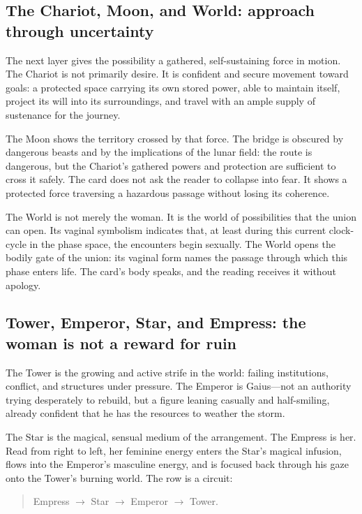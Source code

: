 \subsection{The Chariot, Moon, and World: approach through uncertainty}

The next layer gives the possibility a gathered, self-sustaining force in motion.
The Chariot is not primarily desire. It is confident and secure movement toward
goals: a protected space carrying its own stored power, able to maintain itself,
project its will into its surroundings, and travel with an ample supply of
sustenance for the journey.

The Moon shows the territory crossed by that force. The bridge is obscured by
dangerous beasts and by the implications of the lunar field: the route is
dangerous, but the Chariot's gathered powers and protection are sufficient to
cross it safely. The card does not ask the reader to collapse into fear. It
shows a protected force traversing a hazardous passage without losing its
coherence.

The World is not merely the woman. It is the world of possibilities that the
union can open. Its vaginal symbolism indicates that, at least during this
current clock-cycle in the phase space, the encounters begin sexually. The
World opens the bodily gate of the union: its vaginal form names the passage
through which this phase enters life. The card's body speaks, and the reading
receives it without apology.

\subsection{Tower, Emperor, Star, and Empress: the woman is not a reward for ruin}

The Tower is the growing and active strife in the world: failing institutions,
conflict, and structures under pressure. The Emperor is Gaius—not an authority
trying desperately to rebuild, but a figure leaning casually and half-smiling,
already confident that he has the resources to weather the storm.

The Star is the magical, sensual medium of the arrangement. The Empress is her.
Read from right to left, her feminine energy enters the Star's magical infusion,
flows into the Emperor's masculine energy, and is focused back through his gaze
onto the Tower's burning world. The row is a circuit:

\begin{quote}
Empress \(\rightarrow\) Star \(\rightarrow\) Emperor \(\rightarrow\) Tower.
\end{quote}

